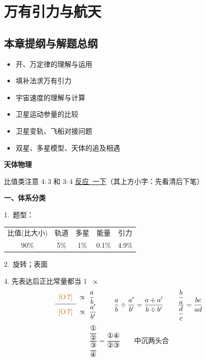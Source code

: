 \chapter{万有引力与航天}
\label{ch:05}

\section{本章提纲与解题总纲}
\begin{itemize}
  \item 开、万定律的理解与运用
  \item 填补法求万有引力
  \item 宇宙速度的理解与计算
  \item 卫星运动参量的比较
  \item 卫星变轨、飞船对接问题
  \item 双星、多星模型、天体的追及相遇 %
\end{itemize}

\textbf{天体物理}

比值类\quad {}\quad 注意 $4{:}3$ 和 $3{:}4$ \underline{反应\ 一下}\quad （其上方小字：先看清后下笔）

\textbf{一、体系分类}

1.\ 题型：
\begin{tabular}[t]{@{}c@{\ ；}c@{\ ；}c@{\ ；}c@{\ ；}c@{}}
比值(比大小) & 轨道 & 多星 & 能量 & 引力\\
90\% & 5\% & 1\% & 0.1\% & 4.9\%
\end{tabular}

2.\ 旋转；表面

4. 先表达后正比\quad 常量都当 1\ $\propto$
\[
\begin{array}{cl}
\text{\unclear{O}} & \propto\ \dfrac{a}{b}\\ \cline{1-1}
\text{\unclear{O}} & \propto\ \dfrac{a'}{b'}
\end{array}
\qquad
\frac{a}{b}\div\frac{a'}{b'}=\frac{a\div a'}{b\div b'}
\qquad
\frac{\dfrac{b}{a}}{\dfrac{d}{c}}=\frac{bc}{ad}
\]
\[
\frac{\dfrac{\text{①}}{\text{②}}}{\dfrac{\text{③}}{\text{④}}}=\frac{\text{①④}}{\text{②③}}
\qquad \text{中沉两头合}
\]


